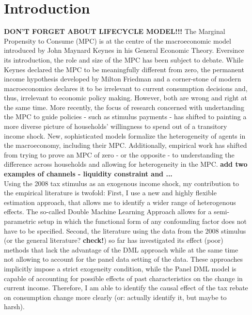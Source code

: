 \section{Introduction} \label{sec:intro}
\textbf{DON'T FORGET ABOUT LIFECYCLE MODEL!!!}
The Marginal Propensity to Consume (MPC) is at the centre of the macroeconomic model introduced by John Maynard Keynes in his General Economic Theory. Eversince its introduction, the role and size of the MPC has been subject to debate. While Keynes declared the MPC to be meaningfully different from zero, the permanent income hypothesis developed by Milton Friedman and a corner-stone of modern macroeconomics declares it to be irrelevant to current consumption decisions and, thus, irrelevant to economic policy making. However, both are wrong and right at the same time. More recently, the focus of research concerned with undertanding the MPC to guide policies - such as stimulus payments - has shifted to painting a more diverse picture of households' willingness to spend out of a transitory income shock. New, sophisticated models formalize the heterogeneity of agents in the macroeconomy, including their MPC. Additionally, empirical work has shifted from trying to prove an MPC of zero - or the opposite - to understanding the difference across households and allowing for heterogeneity in the MPC. \textbf{add two examples of channels - liquidity constraint and ...} \\
Using the 2008 tax stimulus as an exogenous income shock, my contribution to the empirical literature is twofold: First, I use a new and highly flexible estimation approach, that allows me to identify a wider range of heterogenous effects. The so-called Double Machine Learning Approach allows for a semi-parametric setup in which the functional form of any confounding factor does not have to be specified. Second, the literature using the data from the 2008 stimulus (or the general literature? \textbf{check!}) so far has investigated its effect (poor) methods that lack the advantage of the DML approach while at the same time not allowing to account for the panel data setting of the data. These approaches implicitly impose a strict exogeneity condition, while the Panel DML model is capable of accounting for possible effects of past characteristics on the change in current income. Therefore, I am able to identify the causal effect of the tax rebate on consumption change more clearly (or: actually identify it, but maybe to harsh). \\
